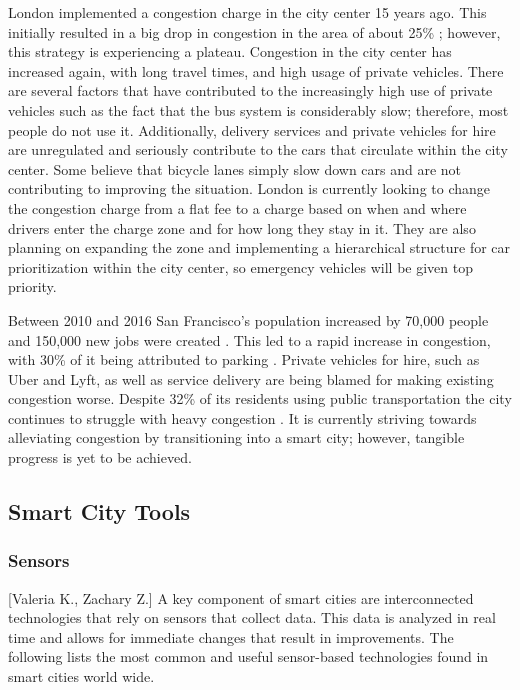 \documentclass[12pt]{article}                               %
\begin{document}
London implemented a congestion charge in the city center 15 years ago. This initially resulted in a big drop in congestion in the area of about 25\% \cite{Badstuber2018LondonIt}; however, this strategy is experiencing a plateau. Congestion in the city center has increased again, with long travel times, and high usage of private vehicles. There are several factors that have contributed to the increasingly high use of private vehicles such as the fact that the bus system is considerably slow; therefore, most people do not use it. Additionally, delivery services and private vehicles for hire are unregulated and seriously contribute to the cars that circulate within the city center. Some believe that bicycle lanes simply slow down cars and are not contributing to improving the situation. London is currently looking to change the congestion charge from a flat fee to a charge based on when and where drivers enter the charge zone and for how long they stay in it. They are also planning on expanding the zone and implementing a hierarchical structure for car prioritization within the city center, so emergency vehicles will be given top priority. 

Between 2010 and 2016 San Francisco's population increased by 70,000 people and 150,000 new jobs were created \cite{Marshall2018UberComplicated}. This led to a rapid increase in congestion, with 30\% of it being attributed to parking \cite{Marshall2018UberComplicated}. Private vehicles for hire, such as Uber and Lyft, as well as service delivery are being blamed for making existing congestion worse. Despite 32\% of its residents using public transportation the city continues to struggle with heavy congestion \cite{Marshall2018UberComplicated}. It is currently striving towards alleviating congestion by transitioning into a smart city; however, tangible progress is yet to be achieved. 

\subsection{Smart City Tools} 
\subsubsection{Sensors}[Valeria K., Zachary Z.] \label{sec:smart_city_sensors}
A key component of smart cities are interconnected technologies that rely on sensors that collect data. This data is analyzed in real time and allows for immediate changes that result in improvements. The following lists the most common and useful sensor-based technologies found in smart cities world wide. 
\end{document}
